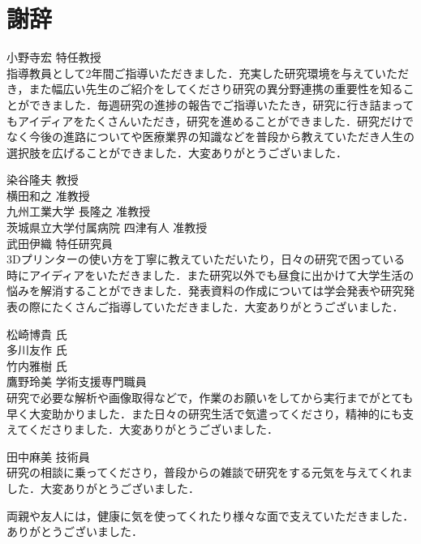 \chapter*{謝辞}%
%

小野寺宏 特任教授\\
指導教員として2年間ご指導いただきました．充実した研究環境を与えていただき，また幅広い先生のご紹介をしてくださり研究の異分野連携の重要性を知ることができました．毎週研究の進捗の報告でご指導いたたき，研究に行き詰まってもアイディアをたくさんいただき，研究を進めることができました．研究だけでなく今後の進路についてや医療業界の知識などを普段から教えていただき人生の選択肢を広げることができました．大変ありがとうございました．

染谷隆夫 教授\\

横田和之 准教授\\

九州工業大学 長隆之 准教授\\


茨城県立大学付属病院 四津有人 准教授\\


武田伊織 特任研究員\\
3Dプリンターの使い方を丁寧に教えていただいたり，日々の研究で困っている時にアイディアをいただきました．また研究以外でも昼食に出かけて大学生活の悩みを解消することができました．発表資料の作成については学会発表や研究発表の際にたくさんご指導していただきました．大変ありがとうございました．

松崎博貴 氏\\


多川友作 氏\\


竹内雅樹 氏\\


鷹野玲美 学術支援専門職員\\
研究で必要な解析や画像取得などで，作業のお願いをしてから実行までがとても早く大変助かりました．また日々の研究生活で気遣ってくださり，精神的にも支えてくださりました．大変ありがとうございました．

田中麻美 技術員\\
研究の相談に乗ってくださり，普段からの雑談で研究をする元気を与えてくれました．大変ありがとうございました．

\vspace{12pt}
両親や友人には，健康に気を使ってくれたり様々な面で支えていただきました．ありがとうございました．
